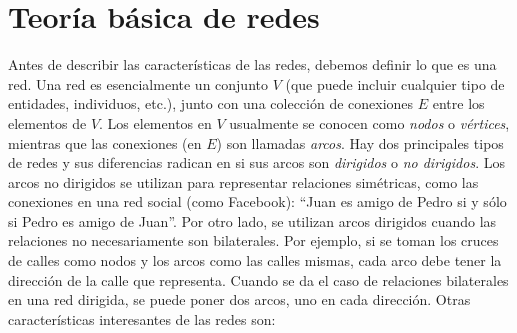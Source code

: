\documentclass[12pt]{report}
\begin{document}
\section{Teoría básica de redes}

Antes de describir las características de las redes, debemos definir lo que es una red. Una red es esencialmente un conjunto $V$ (que puede incluir cualquier tipo de entidades, individuos, etc.), junto con una colección de conexiones $E$ entre los elementos de $V$. Los elementos en $V$ usualmente se conocen como \emph{nodos} o \emph{vértices}, mientras que las conexiones (en $E$) son llamadas \emph{arcos}. Hay dos principales tipos de redes y sus diferencias radican en si sus arcos son \emph{dirigidos} o \emph{no dirigidos}. Los arcos no dirigidos se utilizan para representar relaciones simétricas, como las conexiones en una red social (como Facebook): ``Juan es amigo de Pedro si y sólo si Pedro es amigo de Juan''. Por otro lado, se utilizan arcos dirigidos cuando las relaciones no necesariamente son bilaterales. Por ejemplo, si se toman los cruces de calles como nodos y los arcos como las calles mismas, cada arco debe tener la dirección de la calle que representa. Cuando se da el caso de relaciones bilaterales en una red dirigida, se puede poner dos arcos, uno en cada dirección. Otras características interesantes de las redes son:
\end{document}
